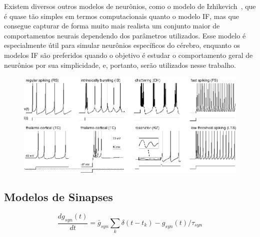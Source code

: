 Existem diversos outros modelos de neurônios, como o modelo de Izhikevich~\cite{izhikevichSimple2003}, que é quase tão simples em
termos computacionais quanto o modelo IF, mas que consegue capturar de forma muito mais realista um conjunto maior de
comportamentos neurais dependendo dos parâmetros utilizados. Esse modelo é especialmente útil para simular neurônios específicos
do cérebro, enquanto os modelos IF são preferidos quando o objetivo é estudar o comportamento geral de neurônios por sua
simplicidade, e, portanto, serão utilizados nesse trabalho.

\begin{figure}[!ht]
\centering\label{fig_izhikevich}
\includegraphics[width=\linewidth]{figuras/izhikevich.png}
\end{figure}

\subsection{Modelos de Sinapses}\label{subsection_modelos_sinapses}

\begin{equation}
\label{eq_sinapse}
\frac{dg_{syn}(t)}{dt} = \bar{g}_{syn}\sum_{k}{\delta(t-t_k)} - g_{syn}(t)/\tau_{syn}
\end{equation}
